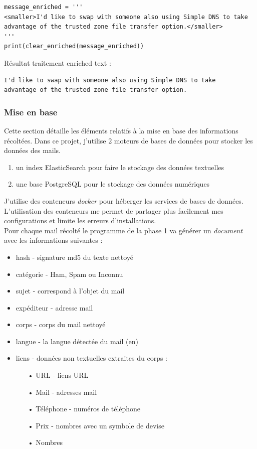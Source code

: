\documentclass[a4paper,12pt]{article}
\begin{document}
				\begin{lstlisting}[title=Traitement enriched text]
message_enriched = '''
<smaller>I'd like to swap with someone also using Simple DNS to take
advantage of the trusted zone file transfer option.</smaller>
'''
print(clear_enriched(message_enriched))
				\end{lstlisting}
				Résultat traitement enriched text :
				\begin{verbatim}
I'd like to swap with someone also using Simple DNS to take
advantage of the trusted zone file transfer option.
				\end{verbatim}


		\subsubsection{Mise en base}
			Cette section détaille les éléments relatifs à la mise en base des informations récoltées. Dans ce projet, j'utilise 2 moteurs de bases de données pour stocker les données des mails. 
			\begin{enumerate}
				\item un index ElasticSearch pour faire le stockage des données textuelles
				\item une base PostgreSQL pour le stockage des données numériques
			\end{enumerate}
				 
			J'utilise des conteneurs \emph{docker} pour héberger les services de bases de données. 
			L'utilisation des conteneurs me permet de partager plus facilement mes configurations et limite les erreurs d'installations.\\
			
			Pour chaque mail récolté le programme de la phase 1 va générer un \emph{document} avec les informations suivantes :
				\begin{itemize}
					\item hash - signature md5 du texte nettoyé 
					\item catégorie - Ham, Spam ou Inconnu
					\item sujet - correspond à l'objet du mail
					\item expéditeur - adresse mail
					\item corps - corps du mail nettoyé
					\item langue - la langue détectée du mail (en)
					\item liens - données non textuelles extraites du corps :
						\begin{itemize}
							\item[•] URL - liens URL
							\item[•] Mail - adresses mail
							\item[•] Téléphone - numéros de téléphone
							\item[•] Prix - nombres avec un symbole de devise
							\item[•] Nombres
						\end{itemize}
				\end{itemize}
				
\end{document}
